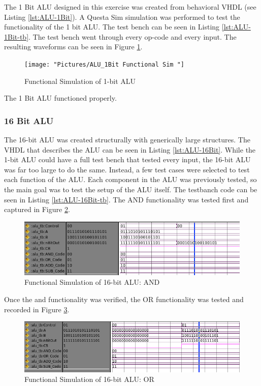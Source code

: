 \documentclass[11pt]{article}
\begin{document}
			The 1 Bit ALU designed in this exercise was created from behavioral VHDL (see Listing \ref{lst:ALU-1Bit}). A Questa Sim simulation was performed to test the functionality of the 1 bit ALU. The test bench can be seen in Listing \ref{lst:ALU-1Bit-tb}. The test bench went through every op-code and every input. The resulting waveforms can be seen in Figure \ref{fig:alu1bit-functional-sim-}.
		
			\begin{figure}[H]
				\centering
				\texttt{[image: "Pictures/ALU\_1Bit Functional Sim "]}
				\caption{Functional Simulation of 1-bit ALU}
				\label{fig:alu1bit-functional-sim-}
			\end{figure}
		
			The 1 Bit ALU functioned properly.
		
		\subsubsection{16 Bit ALU}
		
			The 16-bit ALU was created structurally with generically large structures. The VHDL that describes the ALU can be seen in Listing \ref{lst:ALU-16Bit}. While the 1-bit ALU could have a full test bench that tested every input, the 16-bit ALU was far too large to do the same. Instead, a few test cases were selected to test each function of the ALU. Each component in the ALU was previously tested, so the main goal was to test the setup of the ALU itself. The testbanch code can be seen in Listing \ref{lst:ALU-16Bit-tb}. The AND functionality was tested first and captured in Figure \ref{fig:16-bit-alu-and}.
		
			\begin{figure}[H]
				\centering
				\includegraphics[width=0.7\linewidth]{"Pictures/16 Bit ALU AND"}
				\caption{Functional Simulation of 16-bit ALU: AND}
				\label{fig:16-bit-alu-and}
			\end{figure}
		
			Once the and functionality was verified, the OR functionality was tested and recorded in Figure \ref{fig:16-bit-alu-or}.
		
			\begin{figure}[H]
				\centering
				\includegraphics[width=0.7\linewidth]{"Pictures/16 Bit ALU OR"}
				\caption{Functional Simulation of 16-bit ALU: OR}
				\label{fig:16-bit-alu-or}
			\end{figure}
			
\end{document}

